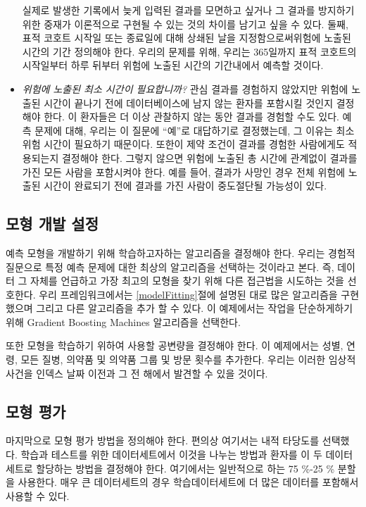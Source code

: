 \documentclass[11pt]{book}
\theoremstyle{definition}
\theoremstyle{definition}
\theoremstyle{definition}
\theoremstyle{remark}
\begin{document}
\begin{itemize}
  실제로 발생한 기록에서 늦게 입력된 결과를 모면하고 싶거나 그 결과를
  방지하기 위한 중재가 이론적으로 구현될 수 있는 것의 차이를 남기고 싶을
  수 있다. 둘째, 표적 코호트 시작일 또는 종료일에 대해 상쇄된 날을
  지정함으로써위험에 노출된 시간의 기간 정의해야 한다. 우리의 문제를
  위해, 우리는 365일까지 표적 코호트의 시작일부터 하루 뒤부터 위험에
  노출된 시간의 기간내에서 예측할 것이다.
\item
  \emph{위험에 노출된 최소 시간이 필요합니까?} 관심 결과를 경험하지
  않았지만 위험에 노출된 시간이 끝나기 전에 데이터베이스에 남지 않는
  환자를 포함시킬 것인지 결정해야 한다. 이 환자들은 더 이상 관찰하지
  않는 동안 결과를 경험할 수도 있다. 예측 문제에 대해, 우리는 이 질문에
  ``예''로 대답하기로 결정했는데, 그 이유는 최소 위험 시간이 필요하기
  때문이다. 또한이 제약 조건이 결과를 경험한 사람에게도 적용되는지
  결정해야 한다. 그렇지 않으면 위험에 노출된 총 시간에 관계없이 결과를
  가진 모든 사람을 포함시켜야 한다. 예를 들어, 결과가 사망인 경우 전체
  위험에 노출된 시간이 완료되기 전에 결과를 가진 사람이 중도절단될
  가능성이 있다.
\end{itemize}

\subsection{모형 개발 설정}\label{--}

예측 모형을 개발하기 위해 학습하고자하는 알고리즘을 결정해야 한다.
우리는 경험적 질문으로 특정 예측 문제에 대한 최상의 알고리즘을 선택하는
것이라고 본다. 즉, 데이터 그 자체를 언급하고 가장 최고의 모형을 찾기
위해 다른 접근법을 시도하는 것을 선호한다. 우리 프레임워크에서는
\ref{modelFitting}절에 설명된 대로 많은 알고리즘을 구현했으며 그리고
다른 알고리즘을 추가 할 수 있다. 이 예제에서는 작업을 단순하게하기 위해
Gradient Boosting Machines 알고리즘을 선택한다.

또한 모형을 학습하기 위하여 사용할 공변량을 결정해야 한다. 이 예제에서는
성별, 연령, 모든 질병, 의약품 및 의약품 그룹 및 방문 횟수를 추가한다.
우리는 이러한 임상적 사건을 인덱스 날짜 이전과 그 전 해에서 발견할 수
있을 것이다.

\subsection{모형 평가}\label{-}

마지막으로 모형 평가 방법을 정의해야 한다. 편의상 여기서는 내적 타당도를
선택했다. 학습과 테스트를 위한 데이터세트에서 이것을 나누는 방법과
환자를 이 두 데이터세트로 할당하는 방법을 결정해야 한다. 여기에서는
일반적으로 하는 75 \%-25 \% 분할을 사용한다. 매우 큰 데이터세트의 경우
학습데이터세트에 더 많은 데이터를 포함해서 사용할 수 있다.
\end{document}
